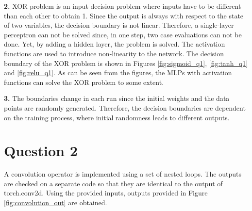 \documentclass{assignment}
\begin{document}
\textbf{2.}
\noindent XOR problem is an input decision problem where inputs have to be different than each other to obtain 1. Since the output is always with respect to the state of two variables, the decision boundary is not linear. Therefore, a single-layer perceptron can not be solved since, in one step, two case evaluations can not be done. Yet, by adding a hidden layer, the problem is solved. The activation functions are used to introduce non-linearity to the network. The decision boundary of the XOR problem is shown in Figures \ref{fig:sigmoid_q1}, \ref{fig:tanh_q1} and \ref{fig:relu_q1}. As can be seen from the figures, the MLPs with activation functions can solve the XOR problem to some extent.

\textbf{3.}
\noindent The boundaries change in each run since the initial weights and the data points are randomly generated. Therefore, the decision boundaries are dependent on the training process, where initial randomness leads to different outputs.


\section{Question 2}
A convolution operator is implemented using a set of nested loops. The outputs are checked on a separate code so that they are identical to the output of torch.conv2d. Using the provided inputs, outputs provided in Figure \ref{fig:convolution_out} are obtained.

\end{document}
